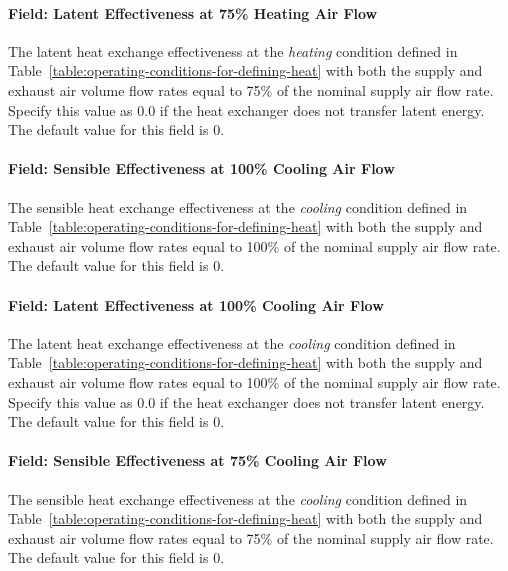\paragraph{Field: Latent Effectiveness at 75\% Heating Air Flow}\label{field-latent-effectiveness-at-75-heating-air-flow}

The latent heat exchange effectiveness at the \emph{heating} condition defined in Table~\ref{table:operating-conditions-for-defining-heat} with both the supply and exhaust air volume flow rates equal to 75\% of the nominal supply air flow rate. Specify this value as 0.0 if the heat exchanger does not transfer latent energy. The default value for this field is 0.

\paragraph{Field: Sensible Effectiveness at 100\% Cooling Air Flow}\label{field-sensible-effectiveness-at-100-cooling-air-flow}

The sensible heat exchange effectiveness at the \emph{cooling} condition defined in Table~\ref{table:operating-conditions-for-defining-heat} with both the supply and exhaust air volume flow rates equal to 100\% of the nominal supply air flow rate. The default value for this field is 0.

\paragraph{Field: Latent Effectiveness at 100\% Cooling Air Flow}\label{field-latent-effectiveness-at-100-cooling-air-flow}

The latent heat exchange effectiveness at the \emph{cooling} condition defined in Table~\ref{table:operating-conditions-for-defining-heat} with both the supply and exhaust air volume flow rates equal to 100\% of the nominal supply air flow rate. Specify this value as 0.0 if the heat exchanger does not transfer latent energy. The default value for this field is 0.

\paragraph{Field: Sensible Effectiveness at 75\% Cooling Air Flow}\label{field-sensible-effectiveness-at-75-cooling-air-flow}

The sensible heat exchange effectiveness at the \emph{cooling} condition defined in Table~\ref{table:operating-conditions-for-defining-heat} with both the supply and exhaust air volume flow rates equal to 75\% of the nominal supply air flow rate. The default value for this field is 0.

